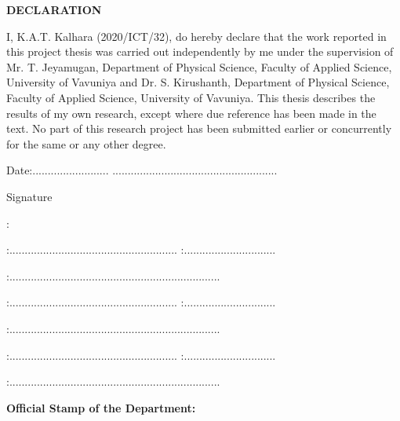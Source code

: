 \begin{center}
    \large{\textbf{DECLARATION}}
\end{center}%
\vspace{0.3in}

\noindent
I, K.A.T. Kalhara (2020/ICT/32), do hereby declare that the work reported in this project thesis was carried out independently by me under the supervision of Mr. T. Jeyamugan, Department of Physical Science, Faculty of Applied Science, University of Vavuniya and Dr. S. Kirushanth, Department of Physical Science, Faculty of Applied Science, University of Vavuniya. This thesis describes the results of my own research, except where due reference has been made in the text. No part of this research project has been submitted earlier or concurrently for the same or any other degree.

\vspace{0.5in}
\noindent Date:.........................\hspace{2in} ......................................................
\begin{flushright}Signature$\;\;\;\;\;\;\;\;\;\;\;\;\;\;\;\;\;\;\;\;\;\;\;\;\;\;\;$\end{flushright}
\vspace{0.8in}
\noindent {}:
\vspace{0.2in}

\noindent {}:.......................................................\hspace{0.5in} :..............................
\vspace{0.3in}

:.....................................................................

\vspace{0.3in}
\noindent {}:.......................................................\hspace{0.3in} :..............................
\vspace{0.3in}


:.....................................................................

\vspace{0.3in}
\noindent {}:.......................................................\hspace{0.3in} :..............................
\vspace{0.3in}

:.....................................................................

\vspace{0.5in}
\noindent\textbf{\large Official Stamp of the Department:} 
